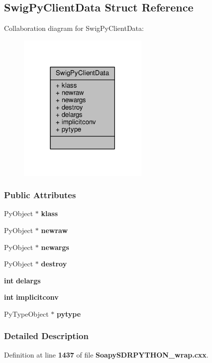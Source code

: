 \subsection{Swig\+Py\+Client\+Data Struct Reference}
\label{structSwigPyClientData}


Collaboration diagram for Swig\+Py\+Client\+Data\+:
\nopagebreak
\begin{figure}[H]
\begin{center}
\leavevmode
\includegraphics[width=177pt]{d3/d6b/structSwigPyClientData__coll__graph}
\end{center}
\end{figure}
\subsubsection*{Public Attributes}
\begin{DoxyCompactItemize}
\item 
Py\+Object $\ast$ {\bf klass}
\item 
Py\+Object $\ast$ {\bf newraw}
\item 
Py\+Object $\ast$ {\bf newargs}
\item 
Py\+Object $\ast$ {\bf destroy}
\item 
{\bf int} {\bf delargs}
\item 
{\bf int} {\bf implicitconv}
\item 
Py\+Type\+Object $\ast$ {\bf pytype}
\end{DoxyCompactItemize}


\subsubsection{Detailed Description}


Definition at line {\bf 1437} of file {\bf Soapy\+S\+D\+R\+P\+Y\+T\+H\+O\+N\+\_\+wrap.\+cxx}.



